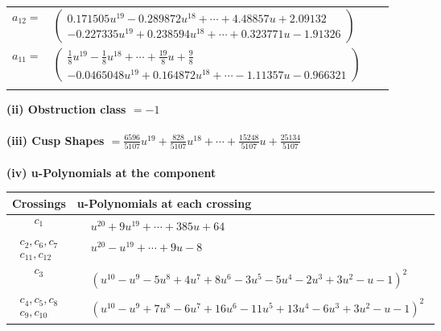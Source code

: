 \documentclass[1p]{elsarticle_modified}
\theoremstyle{definition}
\begin{document}
\begin{tabular}{m{7pt} m{180pt} m{7pt} m{180pt} }
\flushright $a_{12}=$&$\begin{pmatrix}0.171505 u^{19}-0.289872 u^{18}+\cdots+4.48857 u+2.09132\\-0.227335 u^{19}+0.238594 u^{18}+\cdots+0.323771 u-1.91326\end{pmatrix}$ \\
\flushright $a_{11}=$&$\begin{pmatrix}\frac{1}{8} u^{19}-\frac{1}{8} u^{18}+\cdots+\frac{19}{8} u+\frac{9}{8}\\-0.0465048 u^{19}+0.164872 u^{18}+\cdots-1.11357 u-0.966321\end{pmatrix}$\\&\end{tabular}
\flushleft \textbf{(ii) Obstruction class $= -1$}\\~\\
\flushleft \textbf{(iii) Cusp Shapes $= \frac{6596}{5107} u^{19}+\frac{828}{5107} u^{18}+\cdots+\frac{15248}{5107} u+\frac{25134}{5107}$}\\~\\
\newpage\renewcommand{\arraystretch}{1}
\flushleft \textbf{(iv) u-Polynomials at the component}\newline \\
\begin{tabular}{m{50pt}|m{274pt}}
Crossings & \hspace{64pt}u-Polynomials at each crossing \\
\hline $$\begin{aligned}c_{1}\end{aligned}$$&$\begin{aligned}
&u^{20}+9 u^{19}+\cdots+385 u+64
\end{aligned}$\\
\hline $$\begin{aligned}c_{2},c_{6},c_{7}\\c_{11},c_{12}\end{aligned}$$&$\begin{aligned}
&u^{20}- u^{19}+\cdots+9 u-8
\end{aligned}$\\
\hline $$\begin{aligned}c_{3}\end{aligned}$$&$\begin{aligned}
&(u^{10}- u^9-5 u^8+4 u^7+8 u^6-3 u^5-5 u^4-2 u^3+3 u^2- u-1)^2
\end{aligned}$\\
\hline $$\begin{aligned}c_{4},c_{5},c_{8}\\c_{9},c_{10}\end{aligned}$$&$\begin{aligned}
&(u^{10}- u^9+7 u^8-6 u^7+16 u^6-11 u^5+13 u^4-6 u^3+3 u^2- u-1)^2
\end{aligned}$\\
\hline
\end{tabular}\\~\\
\end{document}
